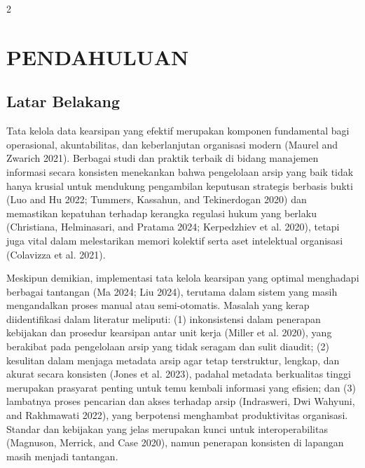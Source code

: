 \documentclass[12pt,a4paper]{article}
\begin{document}
\clearpage
\begin{multicols}{2}

\section{PENDAHULUAN}

\subsection{Latar Belakang}

Tata kelola data kearsipan yang efektif merupakan komponen fundamental bagi operasional, akuntabilitas, dan keberlanjutan organisasi modern (Maurel and Zwarich 2021). Berbagai studi dan praktik terbaik di bidang manajemen informasi secara konsisten menekankan bahwa pengelolaan arsip yang baik tidak hanya krusial untuk mendukung pengambilan keputusan strategis berbasis bukti (Luo and Hu 2022; Tummers, Kassahun, and Tekinerdogan 2020) dan memastikan kepatuhan terhadap kerangka regulasi hukum yang berlaku (Christiana, Helminasari, and Pratama 2024; Kerpedzhiev et al. 2020), tetapi juga vital dalam melestarikan memori kolektif serta aset intelektual organisasi (Colavizza et al. 2021). 

Meskipun demikian, implementasi tata kelola kearsipan yang optimal menghadapi berbagai tantangan (Ma 2024; Liu 2024), terutama dalam sistem yang masih mengandalkan proses manual atau semi-otomatis. Masalah yang kerap diidentifikasi dalam literatur meliputi: (1) inkonsistensi dalam penerapan kebijakan dan prosedur kearsipan antar unit kerja (Miller et al. 2020), yang berakibat pada pengelolaan arsip yang tidak seragam dan sulit diaudit; (2) kesulitan dalam menjaga metadata arsip agar tetap terstruktur, lengkap, dan akurat secara konsisten (Jones et al. 2023), padahal metadata berkualitas tinggi merupakan prasyarat penting untuk temu kembali informasi yang efisien; dan (3) lambatnya proses pencarian dan akses terhadap arsip (Indrasweri, Dwi Wahyuni, and Rakhmawati 2022), yang berpotensi menghambat produktivitas organisasi. Standar dan kebijakan yang jelas merupakan kunci untuk interoperabilitas (Magnuson, Merrick, and Case 2020), namun penerapan konsisten di lapangan masih menjadi tantangan.


\end{multicols}
\end{document}
